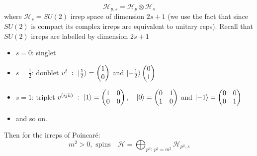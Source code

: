 \begin{equation}
    \mathcal{H}_{p,s} = \mathcal{H}_p\otimes\mathcal{H}_s
\end{equation}
where $\mathcal{H}_s = SU(2)$ irrep space of dimension $2s+1$ (we use the fact that since $SU(2)$ is compact its complex irreps are equivalent to unitary reps). Recall that $SU(2)$ irreps are labelled by dimension $2s+1$

\begin{itemize}
    \item $s = 0$: singlet
    \item $s = \frac{1}{2}$: doublet $v^{i} \ : \  \ket{\frac{1}{2}} =\begin{pmatrix}1\\0\end{pmatrix}$ and $\ket{-\frac{1}{2}}\begin{pmatrix}0\\1\end{pmatrix}$
    \item $s = 1$: triplet $v^{(ijk)} \ : \  \ket{1} =\begin{pmatrix}1 & 0\\0& 0\end{pmatrix}, \ \ \ \ket{0} = \begin{pmatrix}0 & 1\\1& 0\end{pmatrix}$ and $ \ket{-1} =\begin{pmatrix}0 & 0\\0& 1\end{pmatrix}$
    \item and so on.
\end{itemize}
Then for the irreps of Poincar\'e: 
\begin{equation}
    m^2 > 0, \text{ spins }\ \ \ \mathcal{H} = \bigoplus_{p^{\mu}: \ p^2 = m^2}\mathcal{H}_{p^{\mu},s}
\end{equation}

